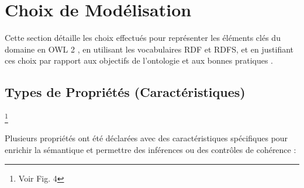\documentclass[9pt,twocolumn,twoside,french]{article}
\begin{document}
\section{Choix de Modélisation}
\label{sec:modelisation}

Cette section détaille les choix effectués pour représenter les éléments clés du domaine en OWL 2 \parencite{W3C2011Owl}, en utilisant les vocabulaires RDF et RDFS, et en justifiant ces choix par rapport aux objectifs de l'ontologie et aux bonnes pratiques \parencite{NoyMcGuinness2001}.

\subsection{Types de Propriétés (Caractéristiques)} \footnote{Voir Fig. 4}

Plusieurs propriétés ont été déclarées avec des caractéristiques spécifiques pour enrichir la sémantique et permettre des inférences ou des contrôles de cohérence :
\end{document}
